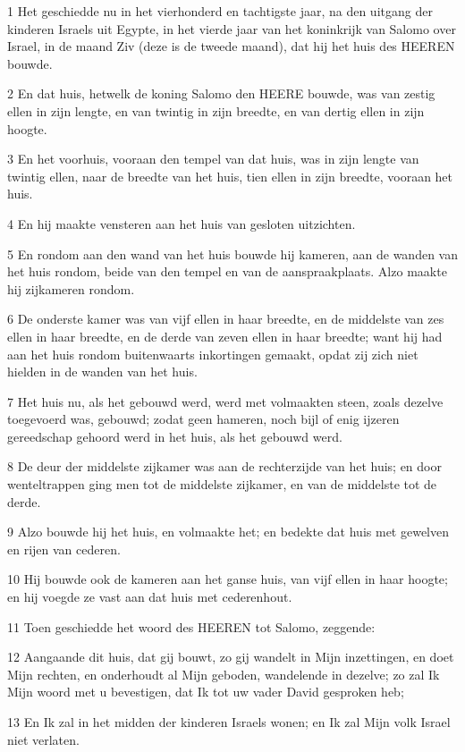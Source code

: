 \par 1 Het geschiedde nu in het vierhonderd en tachtigste jaar, na den uitgang der kinderen Israels uit Egypte, in het vierde jaar van het koninkrijk van Salomo over Israel, in de maand Ziv (deze is de tweede maand), dat hij het huis des HEEREN bouwde.
\par 2 En dat huis, hetwelk de koning Salomo den HEERE bouwde, was van zestig ellen in zijn lengte, en van twintig in zijn breedte, en van dertig ellen in zijn hoogte.
\par 3 En het voorhuis, vooraan den tempel van dat huis, was in zijn lengte van twintig ellen, naar de breedte van het huis, tien ellen in zijn breedte, vooraan het huis.
\par 4 En hij maakte vensteren aan het huis van gesloten uitzichten.
\par 5 En rondom aan den wand van het huis bouwde hij kameren, aan de wanden van het huis rondom, beide van den tempel en van de aanspraakplaats. Alzo maakte hij zijkameren rondom.
\par 6 De onderste kamer was van vijf ellen in haar breedte, en de middelste van zes ellen in haar breedte, en de derde van zeven ellen in haar breedte; want hij had aan het huis rondom buitenwaarts inkortingen gemaakt, opdat zij zich niet hielden in de wanden van het huis.
\par 7 Het huis nu, als het gebouwd werd, werd met volmaakten steen, zoals dezelve toegevoerd was, gebouwd; zodat geen hameren, noch bijl of enig ijzeren gereedschap gehoord werd in het huis, als het gebouwd werd.
\par 8 De deur der middelste zijkamer was aan de rechterzijde van het huis; en door wenteltrappen ging men tot de middelste zijkamer, en van de middelste tot de derde.
\par 9 Alzo bouwde hij het huis, en volmaakte het; en bedekte dat huis met gewelven en rijen van cederen.
\par 10 Hij bouwde ook de kameren aan het ganse huis, van vijf ellen in haar hoogte; en hij voegde ze vast aan dat huis met cederenhout.
\par 11 Toen geschiedde het woord des HEEREN tot Salomo, zeggende:
\par 12 Aangaande dit huis, dat gij bouwt, zo gij wandelt in Mijn inzettingen, en doet Mijn rechten, en onderhoudt al Mijn geboden, wandelende in dezelve; zo zal Ik Mijn woord met u bevestigen, dat Ik tot uw vader David gesproken heb;
\par 13 En Ik zal in het midden der kinderen Israels wonen; en Ik zal Mijn volk Israel niet verlaten.
